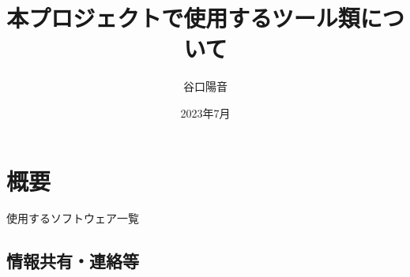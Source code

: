 \documentclass{ltjsarticle}
\begin{document}
\title{本プロジェクトで使用するツール類について}
\author{谷口陽音}
\date{2023年7月}
\maketitle

\section{概要}
使用するソフトウェア一覧
\subsection{情報共有・連絡等}
\end{document}
